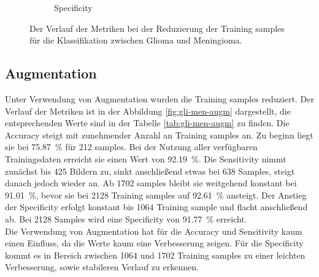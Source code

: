 \begin{figure}[H]
\begin{subfigure}[b]{0.48\textwidth}
    \caption{Specificity}
    \label{fig:gli-men-spec}
  \end{subfigure}
  \caption{Der Verlauf der Metriken bei der Reduzierung der Training samples für die Klassifikation zwischen Glioma und Meningioma.}
  \label{fig:gli-men-reduktion}
\end{figure}
\subsection{Augmentation}
Unter Verwendung von Augmentation wurden die Training samples reduziert.
Der Verlauf der Metriken ist in der Abbildung \ref{fig:gli-men-augm} dargestellt,
die entsprechenden Werte sind in der Tabelle \ref{tab:gli-men-augm} zu finden.
Die Accuracy steigt mit zunehmender Anzahl an Training samples an.
Zu beginn liegt sie bei \SI{75.87}{\percent} für 212 samples. 
Bei der Nutzung aller verfügbaren Trainingsdaten erreicht sie einen Wert von \SI{92.19}{\percent}.
Die Sensitivity nimmt zunächst bis 425 Bildern zu, sinkt anschließend etwas bei 638 Samples, steigt danach jedoch wieder an.
Ab 1702 samples bleibt sie weitgehend konstant bei \SI{91.01}{\%}, bevor sie bei 2128 Training samples auf \SI{92.61}{\%} ansteigt. 
Der Anstieg der Specificity erfolgt konstant bis 1064 Training sample und flacht anschließend ab.
Bei 2128 Samples wird eine Specificity von \SI{91.77}{\%} erreicht.\\
Die Verwendung von Augmentation hat für die Accuracy und Sensitivity kaum einen Einfluss, da die Werte kaum eine Verbesserung zeigen.
Für die Specificity kommt es in Bereich zwischen 1064 und 1702 Training samples zu einer leichten Verbesserung, sowie stabileren Verlauf zu erkennen.
